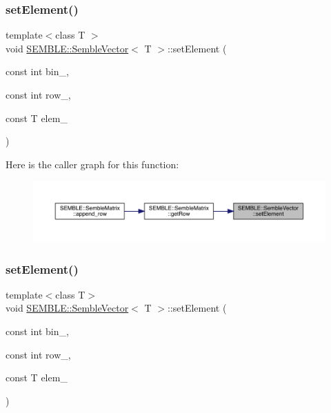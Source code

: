 \mbox{\label{structSEMBLE_1_1SembleVector_ac0fe91a94d59588d817fb4e0f13fcc65}} 
\subsubsection{\texorpdfstring{setElement()}{setElement()}\hspace{0.1cm}{\footnotesize\ttfamily [1/4]}}
{\footnotesize\ttfamily template$<$class T $>$ \\
void \mbox{\hyperlink{structSEMBLE_1_1SembleVector}{S\+E\+M\+B\+L\+E\+::\+Semble\+Vector}}$<$ T $>$\+::set\+Element (\begin{DoxyParamCaption}\item[{const int}]{bin\+\_\+,  }\item[{const int}]{row\+\_\+,  }\item[{const T}]{elem\+\_\+ }\end{DoxyParamCaption})}

Here is the caller graph for this function\+:
\nopagebreak
\begin{figure}[H]
\begin{center}
\leavevmode
\includegraphics[width=350pt]{d9/d94/structSEMBLE_1_1SembleVector_ac0fe91a94d59588d817fb4e0f13fcc65_icgraph}
\end{center}
\end{figure}
\mbox{\label{structSEMBLE_1_1SembleVector_ac0fe91a94d59588d817fb4e0f13fcc65}} 
\subsubsection{\texorpdfstring{setElement()}{setElement()}\hspace{0.1cm}{\footnotesize\ttfamily [2/4]}}
{\footnotesize\ttfamily template$<$class T$>$ \\
void \mbox{\hyperlink{structSEMBLE_1_1SembleVector}{S\+E\+M\+B\+L\+E\+::\+Semble\+Vector}}$<$ T $>$\+::set\+Element (\begin{DoxyParamCaption}\item[{const int}]{bin\+\_\+,  }\item[{const int}]{row\+\_\+,  }\item[{const T}]{elem\+\_\+ }\end{DoxyParamCaption})}

